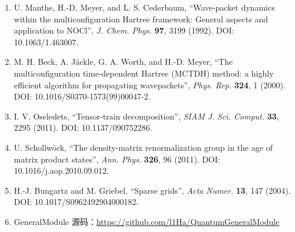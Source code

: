 \documentclass[
]{ctexbook}
\providecommand{\tightlist}{%
  \setlength{\itemsep}{0pt}\setlength{\parskip}{0pt}}
\begin{document}
\begin{enumerate}
\def\labelenumi{\arabic{enumi}.}
\tightlist
\item
  U. Manthe, H.-D. Meyer, and L. S. Cederbaum, ``Wave-packet dynamics
  within the multiconfiguration Hartree framework: General aspects and
  application to NOCl'', \emph{J. Chem. Phys.} \textbf{97}, 3199 (1992).
  DOI: 10.1063/1.463007.
\item
  M. H. Beck, A. Jäckle, G. A. Worth, and H.-D. Meyer, ``The
  multiconfiguration time-dependent Hartree (MCTDH) method: a highly
  efficient algorithm for propagating wavepackets'', \emph{Phys. Rep.}
  \textbf{324}, 1 (2000). DOI: 10.1016/S0370-1573(99)00047-2.
\item
  I. V. Oseledets, ``Tensor-train decomposition'', \emph{SIAM J. Sci.
  Comput.} \textbf{33}, 2295 (2011). DOI: 10.1137/090752286.
\item
  U. Schollwöck, ``The density-matrix renormalization group in the age
  of matrix product states'', \emph{Ann. Phys.} \textbf{326}, 96 (2011).
  DOI: 10.1016/j.aop.2010.09.012.
\item
  H.-J. Bungartz and M. Griebel, ``Sparse grids'', \emph{Acta Numer.}
  \textbf{13}, 147 (2004). DOI: 10.1017/S0962492904000182.
\item
  GeneralModule 源码：\url{https://github.com/l1Ha/QuantumGeneralModule}
\end{enumerate}
\end{document}
